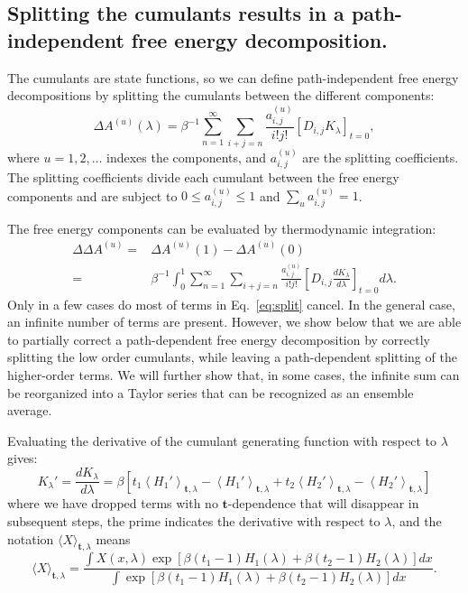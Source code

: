 \documentclass{article}
\let\vec\mathbf
\begin{document}
\subsection{Splitting the cumulants results in a path-independent free energy decomposition.}

The cumulants are state functions, so we can define path-independent free energy decompositions by splitting the cumulants between the different components:
\begin{equation}
\Delta A^{(u)}(\lambda) =
	\beta^{-1} \sum_{n=1}^{\infty}
	\sum_{i+j=n}
	\frac{a_{i,j}^{(u)}}{i!j!}\left[ D_{i,j} K_\lambda\right]_{t=0},
\end{equation}
where $u=1, 2, \ldots$ indexes the components, and $a_{i,j}^{(u)}$ are the splitting coefficients. The splitting coefficients divide each cumulant between the free energy components and are subject to $0 \le a_{i,j}^{(u)} \le 1$ and $\sum_u a_{i,j}^{(u)}=1$.

The free energy components can be evaluated by thermodynamic integration:
\begin{align}
\Delta\Delta A^{(u)} =& \Delta A^{(u)}(1) - \Delta A^{(u)}(0) \nonumber \\
					 =&
	\beta^{-1} \int_0^1 \sum_{n=1}^{\infty}
	\sum_{i+j=n}
	\frac{a_{i,j}^{(u)}}{i!j!}
    \left[ D_{i,j} \frac{dK_\lambda}{d\lambda}\right]_{t=0} d\lambda
    \label{eq:split}.
\end{align}
Only in a few cases do most of terms in Eq.~\ref{eq:split} cancel. In the general case, an infinite number of terms are present. However, we show below that we are able to partially correct a path-dependent free energy decomposition by correctly splitting the low order cumulants, while leaving a path-dependent splitting of the higher-order terms. We will further show that, in some cases, the infinite sum can be reorganized into a Taylor series that can be recognized as an ensemble average.

Evaluating the derivative of the cumulant generating function with respect to $\lambda$ gives:
\begin{equation}
K_\lambda' = 
\frac{dK_\lambda}{d\lambda} =
	\beta \left[
		t_1 \left\langle H_1' \right\rangle_{\vec t,\lambda} -
    	\left\langle H_1' \right\rangle_{\vec t,\lambda} +
	    t_2 \left\langle H_2' \right\rangle_{\vec t,\lambda} -
    	\left\langle H_2' \right\rangle_{\vec t,\lambda}
    \right]
\end{equation}
where we have dropped terms with no $\vec t$-dependence that will disappear in subsequent steps, the prime indicates the derivative with respect to $\lambda$, and the notation $\langle X \rangle_{\vec t, \lambda}$ means
\begin{equation}
\langle X \rangle_{\vec t, \lambda}  =
	\frac
    	{\int X(x, \lambda) 
        	\exp\left[
        		\beta(t_1-1)H_1(\lambda) +
            \beta(t_2-1)H_2(\lambda)
        \right] dx
        }
    	{\int
        	\exp\left[
            \beta(t_1-1)H_1(\lambda) +
            \beta(t_2-1)H_2(\lambda)
        \right] dx
        }.
\end{equation}
\end{document}
